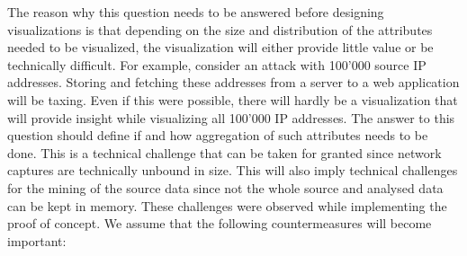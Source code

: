     The reason why this question needs to be answered before designing visualizations is that depending on the size and distribution of the attributes needed to be visualized, the visualization will either provide little value or be technically difficult. For example, consider an attack with 100'000 source IP addresses. Storing and fetching these addresses from a server to a web application will be taxing. Even if this were possible, there will hardly be a visualization that will provide insight while visualizing all 100'000 IP addresses. The answer to this question should define if and how aggregation of such attributes needs to be done.
    This is a technical challenge that can be taken for granted since network captures are technically unbound in size. This will also imply technical challenges for the mining of the source data since not the whole source and analysed data can be kept in memory.
    These challenges were observed while implementing the proof of concept. We assume that the following countermeasures will become important:
